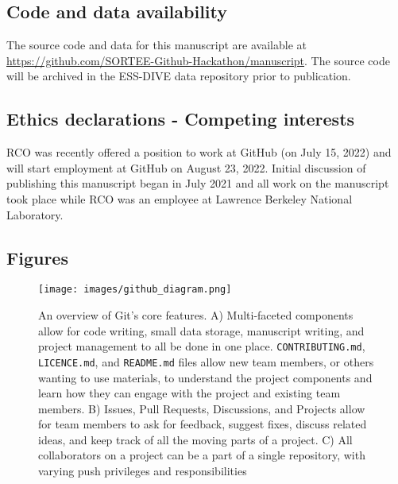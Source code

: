 \hypertarget{code-and-data-availability}{%
\subsection{Code and data availability}\label{code-and-data-availability}}

The source code and data for this manuscript are available at \url{https://github.com/SORTEE-Github-Hackathon/manuscript}.
The source code will be archived in the ESS-DIVE data repository prior to publication.

\hypertarget{ethics-declarations---competing-interests}{%
\subsection{Ethics declarations - Competing interests}\label{ethics-declarations---competing-interests}}

RCO was recently offered a position to work at GitHub (on July 15, 2022) and will start employment at GitHub on August 23, 2022.
Initial discussion of publishing this manuscript began in July 2021 and all work on the manuscript took place while RCO was an employee at Lawrence Berkeley National Laboratory.

\hypertarget{figures}{%
\subsection{Figures}\label{figures}}

\begin{figure}
\hypertarget{fig:github-diagram}{%
\centering
\texttt{[image: images/github\_diagram.png]}
\caption{An overview of Git's core features. A) Multi-faceted components allow for code writing, small data storage, manuscript writing, and project management to all be done in one place. \texttt{CONTRIBUTING.md}, \texttt{LICENCE.md}, and \texttt{README.md} files allow new team members, or others wanting to use materials, to understand the project components and learn how they can engage with the project and existing team members. B) Issues, Pull Requests, Discussions, and Projects allow for team members to ask for feedback, suggest fixes, discuss related ideas, and keep track of all the moving parts of a project. C) All collaborators on a project can be a part of a single repository, with varying push privileges and responsibilities}\label{fig:github-diagram}
}
\end{figure}

